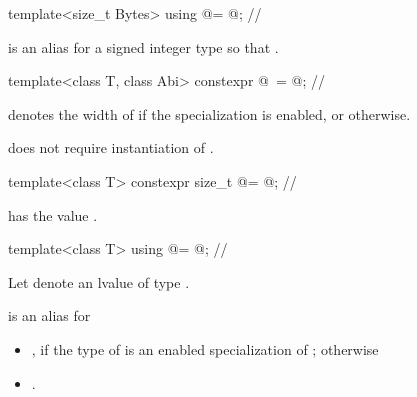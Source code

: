 \begin{itemdecl}
template<size_t Bytes> using @\integerfrom@ = @\seebelow@; // \expos
\end{itemdecl}
\begin{itemdescr}
  \pnum
   is an alias for a signed integer type  so that
  .
\end{itemdescr}

\begin{itemdecl}
template<class T, class Abi>
  constexpr @\simdsizetype\ \simdsizev@ = @\seebelow@; // \expos
\end{itemdecl}
\begin{itemdescr}
  \pnum
   denotes the width of  if
  the specialization  is enabled, or  otherwise.
  \begin{note}
     does not require instantiation of .
  \end{note}
\end{itemdescr}

\begin{itemdecl}
template<class T> constexpr size_t @\maskelementsize@ = @\seebelow@; // \expos
\end{itemdecl}
\begin{itemdescr}
  \pnum
   has the value .
\end{itemdescr}

\begin{itemdecl}
template<class T> using @\deducedsimd@ = @\seebelow@; // \expos
\end{itemdecl}
\begin{itemdescr}
  \pnum Let  denote an lvalue of type .

  \pnum {} is an alias for
  \begin{itemize}

    \item {},
      if the type of  is an enabled specialization of ;
      otherwise

    \item {}.
  \end{itemize}
\end{itemdescr}

